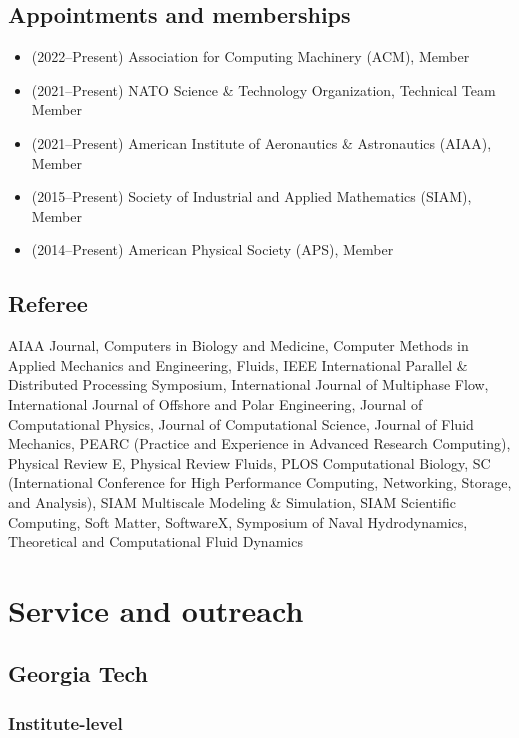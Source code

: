 \subsection{Appointments and memberships}

\begin{itemize}
    \item (2022--Present) Association for Computing Machinery (ACM), Member
    \item (2021--Present) NATO Science \& Technology Organization, Technical Team Member
    \item (2021--Present) American Institute of Aeronautics \& Astronautics (AIAA), Member
    \item (2015--Present) Society of Industrial and Applied Mathematics (SIAM), Member
    \item (2014--Present) American Physical Society (APS), Member
\end{itemize}

\subsection{Referee}

AIAA Journal,
Computers in Biology and Medicine,
Computer Methods in Applied Mechanics and Engineering,
Fluids,
IEEE International Parallel \& Distributed Processing Symposium,
International Journal of Multiphase Flow,
International Journal of Offshore and Polar Engineering,
Journal of Computational Physics,
Journal of Computational Science,
Journal of Fluid Mechanics,
PEARC (Practice and Experience in Advanced Research Computing),
Physical Review E,
Physical Review Fluids,
PLOS Computational Biology,
SC (International Conference for High Performance Computing, Networking, Storage, and Analysis),
SIAM Multiscale Modeling \& Simulation,
SIAM Scientific Computing,
Soft Matter,
SoftwareX,
Symposium of Naval Hydrodynamics,
Theoretical and Computational Fluid Dynamics

\section{Service and outreach}

\subsection{Georgia Tech}

\subsubsection{Institute-level}

